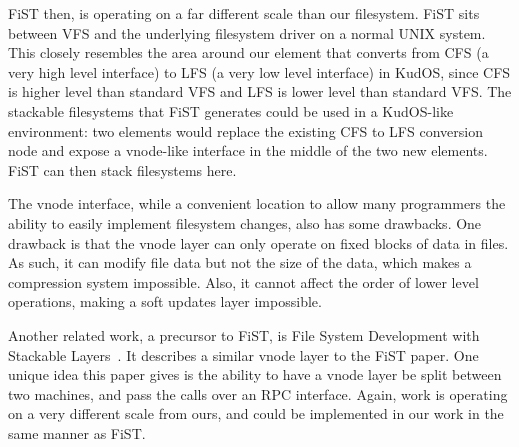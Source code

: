 FiST then, is operating on a far different scale than our
filesystem. FiST sits between VFS and the underlying filesystem driver
on a normal UNIX system. This closely resembles the area around our
element that converts from CFS (a very high level interface) to LFS (a
very low level interface) in KudOS, since CFS is higher level than
standard VFS and LFS is lower level than standard VFS. The stackable
filesystems that FiST generates could be used in a KudOS-like
environment: two elements would replace the existing CFS to LFS
conversion node and expose a vnode-like interface in the middle of the
two new elements. FiST can then stack filesystems here.

The vnode interface, while a convenient location to allow many
programmers the ability to easily implement filesystem changes, also
has some drawbacks. One drawback is that the vnode layer can only
operate on fixed blocks of data in files. As such, it can modify file
data but not the size of the data, which makes a compression system
impossible. Also, it cannot affect the order of lower level
operations, making a soft updates layer impossible.

Another related work, a precursor to FiST, is File System Development
with Stackable Layers~\cite{heidemann93stack}.
It describes a similar vnode layer to the FiST
paper. One unique idea this paper gives is the ability to have a vnode
layer be split between two machines, and pass the calls over an RPC
interface. Again, work is operating on a very different scale from
ours, and could be implemented in our work in the same manner as FiST.
